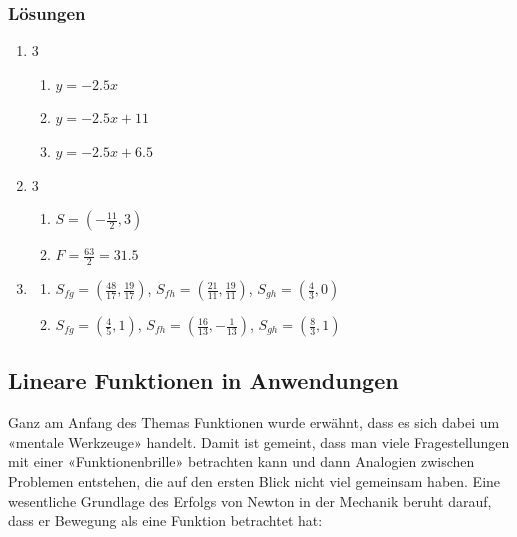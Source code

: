 \subsubsection{Lösungen}
\begin{enumerate}
    \item \begin{multicols}{3}
              \begin{enumerate}
                  \item $y = -2.5x$
                  \item $y = -2.5x + 11$
                  \item $y = -2.5x + 6.5$
              \end{enumerate}
          \end{multicols}
    \item \begin{multicols}{3}
              \begin{enumerate}
                  \item $S = \left( -\frac{11}{2},3 \right)$
                  \item $F = \frac{63}{2} = 31.5$
              \end{enumerate}
          \end{multicols}
    \item \begin{enumerate}
              \item $S_{fg} = \left( \frac{48}{17},\frac{19}{17} \right)$, \quad $S_{fh} = \left( \frac{21}{11},\frac{19}{11} \right)$, \quad $S_{gh} = \left( \frac{4}{3},0 \right)$
              \item $S_{fg} = \left( \frac{4}{5},1 \right)$, \quad $S_{fh} = \left( \frac{16}{13},-\frac{1}{13} \right)$, \quad $S_{gh} = \left( \frac{8}{3},1 \right)$
          \end{enumerate}
\end{enumerate}
\newpage

\subsection{Lineare Funktionen in Anwendungen}
Ganz am Anfang des Themas Funktionen wurde erwähnt, dass es sich dabei um «mentale Werkzeuge» handelt. Damit ist gemeint, dass man viele Fragestellungen mit einer «Funktionenbrille» betrachten kann und dann Analogien zwischen Problemen entstehen, die auf den ersten Blick nicht viel gemeinsam haben. Eine wesentliche Grundlage des Erfolgs von Newton in der Mechanik beruht darauf, dass er Bewegung als eine Funktion betrachtet hat:

